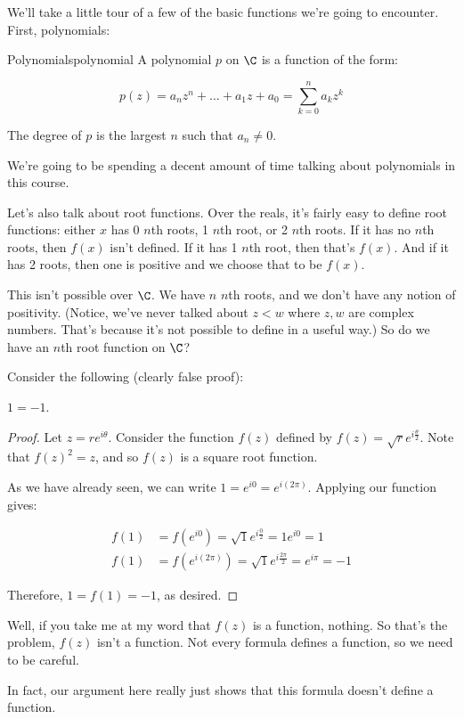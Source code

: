 We'll take a little tour of a few of the basic functions we're going to encounter. First, polynomials:

\begin{defbo}{Polynomials}{polynomial} A polynomial $p$ on $\C$ is a function of the form:

$$p(z) = a_nz^n + \dots + a_1z + a_0 = \sum_{k = 0}^n a_kz^k$$

The degree of $p$ is the largest $n$ such that $a_n \ne 0$.
\end{defbo}

We're going to be spending a decent amount of time talking about polynomials in this course. 

Let's also talk about root functions. Over the reals, it's fairly easy to define root functions: either $x$ has 0 $n$th roots, 1 $n$th root, or 2 $n$th roots. If it has no $n$th roots, then $f(x)$ isn't defined. If it has 1 $n$th root, then that's $f(x)$. And if it has 2 roots, then one is positive and we choose that to be $f(x)$.

This isn't possible over $\C$. We have $n$ $n$th roots, and we don't have any notion of positivity. (Notice, we've never talked about $z < w$ where $z,w$ are complex numbers. That's because it's not possible to define in a useful way.) So do we have an $n$th root function on $\C$?

\begin{ex}{}{} Consider the following (clearly false proof):

\begin{claim} $1 = -1$.\end{claim}

\begin{proof} Let $z = re^{i\theta}$. Consider the function $f(z)$ defined by $f(z) = \sqrt{r}e^{i\frac{\theta}{2}}$. Note that $f(z)^2 = z$, and so $f(z)$ is a square root function.

As we have already seen, we can write $1 = e^{i0} = e^{i(2\pi)}$. Applying our function gives:


\begin{align*}f(1) &= f(e^{i0}) = \sqrt{1}e^{i\frac{0}{2}} = 1e^{i0} = 1\\
f(1) &= f(e^{i(2\pi)}) = \sqrt{1}e^{i\frac{2\pi}{2}} = e^{i\pi} = -1\end{align*}

Therefore, $1 = f(1) = -1$, as desired.\end{proof}



Well, if you take me at my word that $f(z)$ is a function, nothing. So that's the problem, $f(z)$ isn't a function. Not every formula defines a function, so we need to be careful.

In fact, our argument here really just shows that this formula doesn't define a function.

\end{ex}


